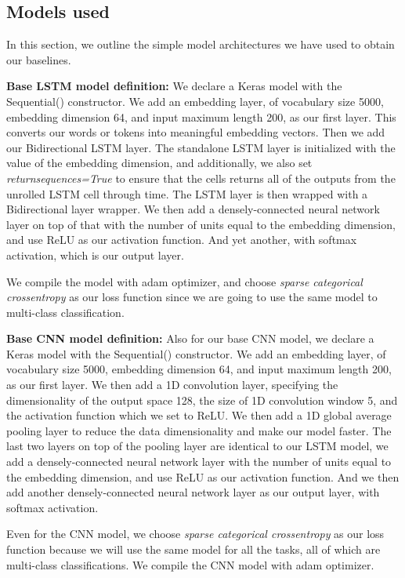 \documentclass[sigplan,review,anonymous]{acmart}\settopmatter{printfolios=true,printccs=false,printacmref=false}
\begin{document}
\subsection{Models used}
In this section, we outline the simple model architectures we have used to obtain our baselines. \newline

\noindent
\textbf{Base LSTM model definition:} We declare a Keras model with the Sequential() constructor. We add an embedding layer, of vocabulary size 5000, embedding dimension 64, and input maximum length 200, as our first layer. This converts our words or tokens into meaningful embedding vectors. Then we add our Bidirectional LSTM layer. The standalone LSTM layer is initialized with the value of the embedding dimension, and additionally, we also set \textit{return\textunderscore sequences=True} to ensure that the cells returns all of the outputs from the unrolled LSTM cell through time. The LSTM layer is then wrapped with a Bidirectional layer wrapper. We then add a densely-connected neural network layer on top of that with the number of units equal to the embedding dimension, and use ReLU as our activation function. And yet another, with softmax activation, which is our output layer.

We compile the model with adam \cite{kingma2014adam} optimizer, and choose \textit{sparse categorical crossentropy} as our loss function since we are going to use the same model to multi-class classification.  \newline

\noindent
\textbf{Base CNN model definition:} Also for our base CNN model, we declare a Keras model with the Sequential() constructor. We add an embedding layer, of vocabulary size 5000, embedding dimension 64, and input maximum length 200, as our first layer. We then add a 1D convolution layer, specifying the dimensionality of the output space 128, the size of 1D convolution window 5, and the activation function which we set to ReLU. We then add a 1D global average pooling layer to reduce the data dimensionality and make our model faster. The last two layers on top of the pooling layer are identical to our LSTM model, we add a densely-connected neural network layer with the number of units equal to the embedding dimension, and use ReLU as our activation function. And we then add another densely-connected neural network layer as our output layer, with softmax activation. 

Even for the CNN model, we choose \textit{sparse categorical crossentropy} as our loss function because we will use the same model for all the tasks, all of which are multi-class classifications. We compile the CNN model with adam \cite{kingma2014adam} optimizer. \newline
\end{document}
